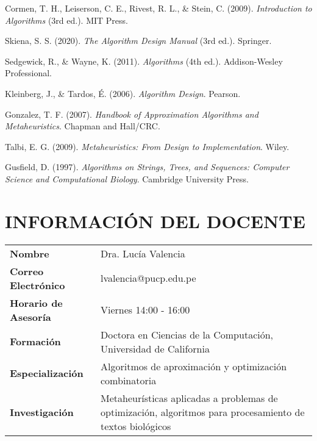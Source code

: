 \documentclass[12pt,a4paper]{article}
\begin{document}
\begin{bibliografiaCurso}
    \item Cormen, T. H., Leiserson, C. E., Rivest, R. L., \& Stein, C. (2009). \textit{Introduction to Algorithms} (3rd ed.). MIT Press.
    \item Skiena, S. S. (2020). \textit{The Algorithm Design Manual} (3rd ed.). Springer.
    \item Sedgewick, R., \& Wayne, K. (2011). \textit{Algorithms} (4th ed.). Addison-Wesley Professional.
    \item Kleinberg, J., \& Tardos, É. (2006). \textit{Algorithm Design}. Pearson.
    \item Gonzalez, T. F. (2007). \textit{Handbook of Approximation Algorithms and Metaheuristics}. Chapman and Hall/CRC.
    \item Talbi, E. G. (2009). \textit{Metaheuristics: From Design to Implementation}. Wiley.
    \item Gusfield, D. (1997). \textit{Algorithms on Strings, Trees, and Sequences: Computer Science and Computational Biology}. Cambridge University Press.
\end{bibliografiaCurso}

\section{INFORMACIÓN DEL DOCENTE}

\begin{tcolorbox}[colback=white,colframe=pucpAzul,title=\textbf{Perfil del Docente}]
\begin{minipage}{0.25\textwidth}
  \centering
\end{minipage}%
\begin{minipage}{0.75\textwidth}
  \begin{tabularx}{\textwidth}{>{\color{pucpGris}\bfseries}l X}
    Nombre & Dra. Lucía Valencia \\
    Correo Electrónico & lvalencia@pucp.edu.pe \\
    Horario de Asesoría & Viernes 14:00 - 16:00 \\
    Formación & Doctora en Ciencias de la Computación, Universidad de California \\
    Especialización & Algoritmos de aproximación y optimización combinatoria \\
    Investigación & Metaheurísticas aplicadas a problemas de optimización, algoritmos para procesamiento de textos biológicos \\
  \end{tabularx}
\end{minipage}
\end{tcolorbox}
\vspace{0.5cm}
\end{document}
